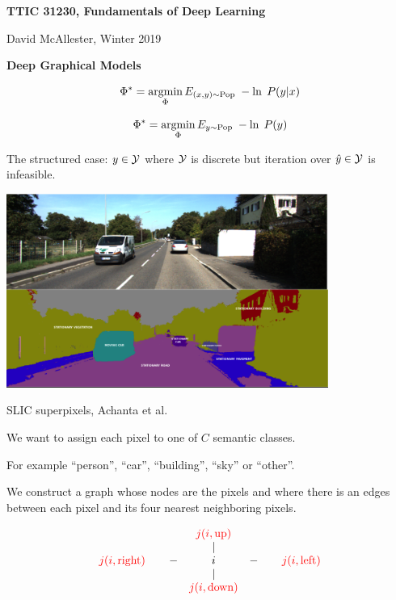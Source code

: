 




{\Huge

  \centerline{\bf TTIC 31230, Fundamentals of Deep Learning}
  \bigskip
  \centerline{David McAllester, Winter 2019}
  \vfill
  \vfill
  \centerline{\bf Deep Graphical Models}
\vfill
\vfill
\vfill


\vfill
{\color{red}
$$\Phi^* = \operatorname*{argmin}_\Phi E_{(x,y) \sim \mathrm{Pop}}\;-\ln \;P(y|x)$$

\vfill
$$\Phi^* = \operatorname*{argmin}_\Phi E_{y \sim \mathrm{Pop}}\;-\ln \;P(y)$$
}

{\color{red} The structured case:} $y \in {\cal Y}$ where ${\cal Y}$ is discrete but {\color{red} iteration over $\hat{y} \in {\cal Y}$ is infeasible}.
\centerline{\includegraphics[height = 2.5in]{../images/SemSeg}}
\centerline{\huge SLIC superpixels, Achanta et al.}

\vfill
We want to assign each pixel to one of $C$ semantic classes.

\vfill
For example ``person'', ``car'', ``building'', ``sky'' or ``other''.


We construct a graph whose nodes are the pixels and where there is an edges between each pixel and its four nearest neighboring pixels.

\vfill
$$\begin{array}{ccccc}
 & & {\color{red} j(i,\mathrm{up})} \\
 & & | \\
 {\color{red} j(i,\mathrm{right})}\;\;\;\; & -& i & -& \;\;\;\;{\color{red} j(i,\mathrm{left})} \\
 & & | \\
 & & {\color{red} j(i,\mathrm{down})}
 \end{array}$$

}
